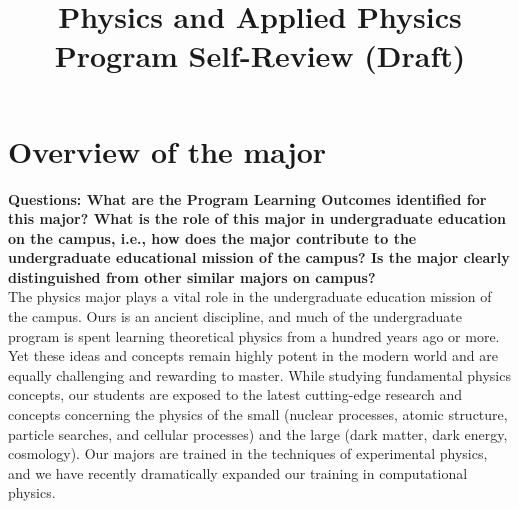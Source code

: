 \documentclass[12pt]{article}
\begin{document}


\title{Physics and Applied Physics \\ Program Self-Review (Draft)}

\maketitle

\section{Overview of the major}

{\bf Questions: What are the Program Learning Outcomes identified for this major? What is the role of this major in undergraduate education on the campus, i.e., how does the major contribute to the undergraduate educational mission of the campus? Is the major clearly distinguished from other similar majors on campus?}\\[3pt]


\noindent
The physics major plays a vital role in the undergraduate education
mission of the campus.  Ours is an ancient discipline, and much of the
undergraduate program is spent learning theoretical physics from a
hundred years ago or more.  Yet these ideas and concepts remain highly
potent in the modern world and are equally challenging and rewarding
to master.  While studying fundamental physics concepts, our students
are exposed to the latest cutting-edge research and concepts
concerning the physics of the small (nuclear processes, atomic
structure, particle searches, and cellular processes) and the large
(dark matter, dark energy, cosmology).  Our majors are trained in the
techniques of experimental physics, and we have recently dramatically
expanded our training in computational physics.
\end{document}
